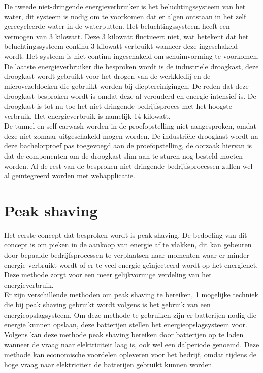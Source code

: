 De tweede niet-dringende energieverbruiker is het beluchtingssysteem van het water, dit systeem is nodig om te voorkomen dat er algen ontstaan in het zelf gerecycleerde water in de waterputten. Het beluchtingssysteem heeft een vermogen van 3 kilowatt. Deze 3 kilowatt fluctueert niet, wat betekent dat het beluchtingssysteem continu 3 kilowatt verbruikt wanneer deze ingeschakeld wordt. Het systeem is niet continu ingeschakeld om schuimvorming te voorkomen.\\

De laatste energieverbruiker die besproken wordt is de industriële droogkast, deze droogkast wordt gebruikt voor het drogen van de werkkledij en de microvezeldoeken die gebruikt worden bij dieptereinigingen. De reden dat deze droogkast besproken wordt is omdat deze al verouderd en energie-intensief is. De droogkast is tot nu toe het niet-dringende bedrijfsproces met het hoogste verbruik. Het energieverbruik is namelijk 14 kilowatt.\\

De tunnel en self carwash worden in de proefopstelling niet aangesproken, omdat deze niet zomaar uitgeschakeld mogen worden. De industriële droogkast wordt na deze bachelorproef pas toegevoegd aan de proefopstelling, de oorzaak hiervan is dat de componenten om de droogkast slim aan te sturen nog besteld moeten worden. Al de rest van de besproken niet-dringende bedrijfsprocessen zullen wel al geïntegreerd worden met webapplicatie. 

\section{Peak shaving}
\label{sec:stand-van-zaken-peak-shaving}

Het eerste concept dat besproken wordt is peak shaving. De bedoeling van dit concept is om pieken in de aankoop van energie af te vlakken, dit kan gebeuren door bepaalde bedrijfsprocessen te verplaatsen naar momenten waar er minder energie verbruikt wordt of er te veel energie geïnjecteerd wordt op het energienet. Deze methode zorgt voor een meer gelijkvormige verdeling van het energieverbruik.\\

Er zijn verschillende methoden om peak shaving te bereiken, 1 mogelijke techniek die bij peak shaving gebruikt wordt volgens \textcite{UDDIN2018} is het gebruik van een energieopslagsysteem. Om deze methode te gebruiken zijn er batterijen nodig die energie kunnen opslaan, deze batterijen stellen het energieopslagsysteem voor. Volgens \textcite{UDDIN2018} kan deze methode peak shaving bereiken door batterijen op te laden wanneer de vraag naar elektriciteit laag is, ook wel een dalperiode genoemd. Deze methode kan economische voordelen opleveren voor het bedrijf, omdat tijdens de hoge vraag naar elektriciteit de batterijen gebruikt kunnen worden.

